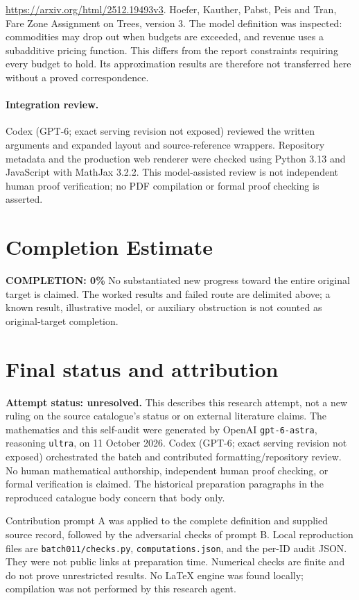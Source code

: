 \documentclass[11pt]{article}
\begin{document}
\url{https://arxiv.org/html/2512.19493v3}. Hoefer, Kauther, Pabst, Peis and Tran, Fare Zone Assignment on Trees, version 3. The model definition was inspected: commodities may drop out when budgets are exceeded, and revenue uses a subadditive pricing function. This differs from the report constraints requiring every budget to hold. Its approximation results are therefore not transferred here without a proved correspondence.


\paragraph{Integration review.} Codex (GPT-6; exact serving revision not exposed) reviewed the written arguments and expanded layout and source-reference wrappers. Repository metadata and the production web renderer were checked using Python 3.13 and JavaScript with MathJax 3.2.2. This model-assisted review is not independent human proof verification; no PDF compilation or formal proof checking is asserted.

\section{Completion Estimate}
\noindent\textbf{COMPLETION: 0\%}
No substantiated new progress toward the entire original target is claimed. The worked results and failed route are delimited above; a known result, illustrative model, or auxiliary obstruction is not counted as original-target completion.

\section{Final status and attribution}
\textbf{Attempt status: unresolved.} This describes this research attempt, not a new ruling on the source catalogue's status or on external literature claims.
The mathematics and this self-audit were generated by OpenAI \texttt{gpt-6-astra}, reasoning \texttt{ultra}, on 11 October 2026. Codex (GPT-6; exact serving revision not exposed) orchestrated the batch and contributed formatting/repository review. No human mathematical authorship, independent human proof checking, or formal verification is claimed. The historical preparation paragraphs in the reproduced catalogue body concern that body only.

Contribution prompt A was applied to the complete definition and supplied source record, followed by the adversarial checks of prompt B. Local reproduction files are \texttt{batch011/checks.py}, \texttt{computations.json}, and the per-ID audit JSON. They were not public links at preparation time. Numerical checks are finite and do not prove unrestricted results. No LaTeX engine was found locally; compilation was not performed by this research agent.
\end{document}
